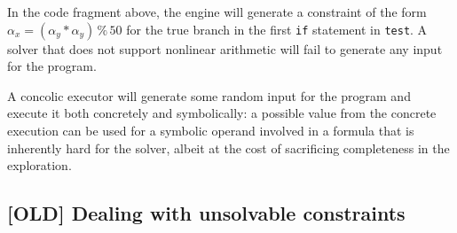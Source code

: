 \noindent In the code fragment above, the engine will generate a constraint of the form $\alpha_x = (\alpha_y*\alpha_y)\,\%\,50$ for the true branch in the first {\tt if} statement in {\tt test}. A solver that does not support nonlinear arithmetic will fail to generate any input for the program.

A concolic executor will generate some random input for the program and execute it both concretely and symbolically: a possible value from the concrete execution can be used for a symbolic operand involved in a formula that is inherently hard for the solver, albeit at the cost of sacrificing completeness in the exploration.




\subsection{[OLD] Dealing with unsolvable constraints} 
\iffalse
Assume to start a concrete execution with a concrete input and in parallel symbolically execute the same program. Whenever a set of constraints cannot be solved by the constraint solver, then use the concrete value to proceed into at least one branch. Example taken from~\cite{CS-CACM13}:
    \begin{lstlisting}[basicstyle=\ttfamily\small]
    int non_linear(int v) {
      return (v * v) % 50;
    }
    \end{lstlisting}
The non-linear operation inside this function can be hard for a solver. Using a concrete execution, the engine can overcome this problem, but then the precision and completeness may be affected.
\fi

